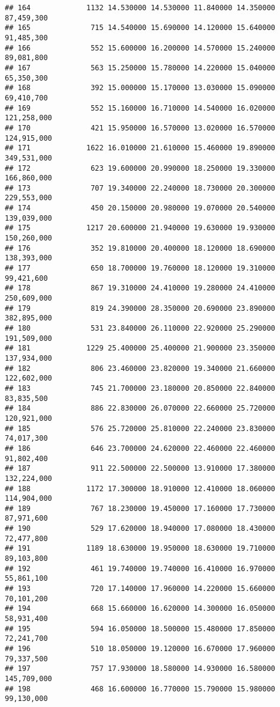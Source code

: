 \documentclass[]{article}
\begin{document}
\begin{verbatim}
## 164             1132 14.530000 14.530000 11.840000 14.350000  87,459,300
## 165              715 14.540000 15.690000 14.120000 15.640000  91,485,300
## 166              552 15.600000 16.200000 14.570000 15.240000  89,081,800
## 167              563 15.250000 15.780000 14.220000 15.040000  65,350,300
## 168              392 15.000000 15.170000 13.030000 15.090000  69,410,700
## 169              552 15.160000 16.710000 14.540000 16.020000 121,258,000
## 170              421 15.950000 16.570000 13.020000 16.570000 124,915,000
## 171             1622 16.010000 21.610000 15.460000 19.890000 349,531,000
## 172              623 19.600000 20.990000 18.250000 19.330000 166,860,000
## 173              707 19.340000 22.240000 18.730000 20.300000 229,553,000
## 174              450 20.150000 20.980000 19.070000 20.540000 139,039,000
## 175             1217 20.600000 21.940000 19.630000 19.930000 150,260,000
## 176              352 19.810000 20.400000 18.120000 18.690000 138,393,000
## 177              650 18.700000 19.760000 18.120000 19.310000  99,421,600
## 178              867 19.310000 24.410000 19.280000 24.410000 250,609,000
## 179              819 24.390000 28.350000 20.690000 23.890000 382,895,000
## 180              531 23.840000 26.110000 22.920000 25.290000 191,509,000
## 181             1229 25.400000 25.400000 21.900000 23.350000 137,934,000
## 182              806 23.460000 23.820000 19.340000 21.660000 122,602,000
## 183              745 21.700000 23.180000 20.850000 22.840000  83,835,500
## 184              886 22.830000 26.070000 22.660000 25.720000 120,921,000
## 185              576 25.720000 25.810000 22.240000 23.830000  74,017,300
## 186              646 23.700000 24.620000 22.460000 22.460000  91,802,400
## 187              911 22.500000 22.500000 13.910000 17.380000 132,224,000
## 188             1172 17.300000 18.910000 12.410000 18.060000 114,904,000
## 189              767 18.230000 19.450000 17.160000 17.730000  87,971,600
## 190              529 17.620000 18.940000 17.080000 18.430000  72,477,800
## 191             1189 18.630000 19.950000 18.630000 19.710000  89,103,800
## 192              461 19.740000 19.740000 16.410000 16.970000  55,861,100
## 193              720 17.140000 17.960000 14.220000 15.660000  70,101,200
## 194              668 15.660000 16.620000 14.300000 16.050000  58,931,400
## 195              594 16.050000 18.500000 15.480000 17.850000  72,241,700
## 196              510 18.050000 19.120000 16.670000 17.960000  79,337,500
## 197              757 17.930000 18.580000 14.930000 16.580000 145,709,000
## 198              468 16.600000 16.770000 15.790000 15.980000  99,130,000

\end{verbatim}
\end{document}
